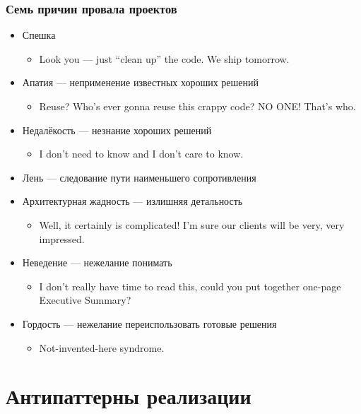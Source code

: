 \documentclass[xetex,mathserif,serif]{beamer}
\begin{document}
	\begin{frame}
		\frametitle{Семь причин провала проектов}
		\begin{footnotesize}
			\begin{itemize}
				\item Спешка
				\begin{itemize}
					\item Look you --- just ``clean up'' the code. We ship tomorrow.
				\end{itemize}
				\item Апатия --- неприменение известных хороших решений
				\begin{itemize}
					\item Reuse? Who’s ever gonna reuse this crappy code? NO ONE! That’s who.
				\end{itemize}
				\item Недалёкость --- незнание хороших решений
				\begin{itemize}
					\item I don’t need to know and I don’t care to know.
				\end{itemize}
				\item Лень --- следование пути наименьшего сопротивления
				\item Архитектурная жадность --- излишняя детальность
				\begin{itemize}
					\item Well, it certainly is complicated! I’m sure our clients will be very, very impressed.
				\end{itemize}
				\item Неведение --- нежелание понимать
				\begin{itemize}
					\item I don't really have time to read this, could you put together one-page Executive Summary?
				\end{itemize}
				\item Гордость --- нежелание переиспользовать готовые решения
				\begin{itemize}
					\item Not-invented-here syndrome.
				\end{itemize}
			\end{itemize}
		\end{footnotesize}
	\end{frame}

	\section{Антипаттерны реализации}
\end{document}
